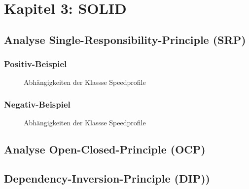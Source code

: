 \section{Kapitel 3: SOLID}

\subsection{Analyse Single-Responsibility-Principle (SRP)}

\subsubsection{Positiv-Beispiel}

\begin{figure}[h]
  \centering
  
  \caption{Abhängigkeiten der Klassse Speedprofile}
\end{figure}

\subsubsection{Negativ-Beispiel}

\begin{figure}[h]
  \centering
  
  \caption{Abhängigkeiten der Klassse Speedprofile}
\end{figure}

\subsection{Analyse Open-Closed-Principle (OCP)}

\subsection{Dependency-Inversion-Principle (DIP))}

